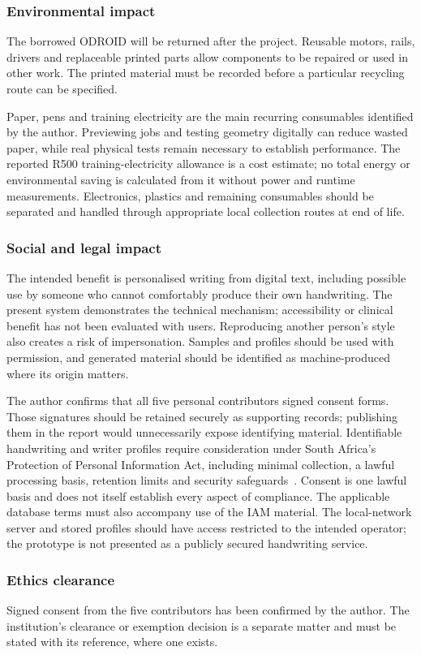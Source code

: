 \subsubsection{Environmental impact}
The borrowed ODROID will be returned after the project. Reusable motors, rails, drivers and replaceable printed parts allow components to be repaired or used in other work. The printed material must be recorded before a particular recycling route can be specified.

Paper, pens and training electricity are the main recurring consumables identified by the author. Previewing jobs and testing geometry digitally can reduce wasted paper, while real physical tests remain necessary to establish performance. The reported R500 training-electricity allowance is a cost estimate; no total energy or environmental saving is calculated from it without power and runtime measurements. Electronics, plastics and remaining consumables should be separated and handled through appropriate local collection routes at end of life.

\subsubsection{Social and legal impact}
The intended benefit is personalised writing from digital text, including possible use by someone who cannot comfortably produce their own handwriting. The present system demonstrates the technical mechanism; accessibility or clinical benefit has not been evaluated with users. Reproducing another person's style also creates a risk of impersonation. Samples and profiles should be used with permission, and generated material should be identified as machine-produced where its origin matters.

The author confirms that all five personal contributors signed consent forms. Those signatures should be retained securely as supporting records; publishing them in the report would unnecessarily expose identifying material. Identifiable handwriting and writer profiles require consideration under South Africa's Protection of Personal Information Act, including minimal collection, a lawful processing basis, retention limits and security safeguards~\cite[PDF pp.~8--9, 11; ss.~10--11, 14 and 19]{popia2013}. Consent is one lawful basis and does not itself establish every aspect of compliance. The applicable database terms must also accompany use of the IAM material. The local-network server and stored profiles should have access restricted to the intended operator; the prototype is not presented as a publicly secured handwriting service.

\subsubsection{Ethics clearance}
Signed consent from the five contributors has been confirmed by the author. The institution's clearance or exemption decision is a separate matter and must be stated with its reference, where one exists.
\FloatBarrier
